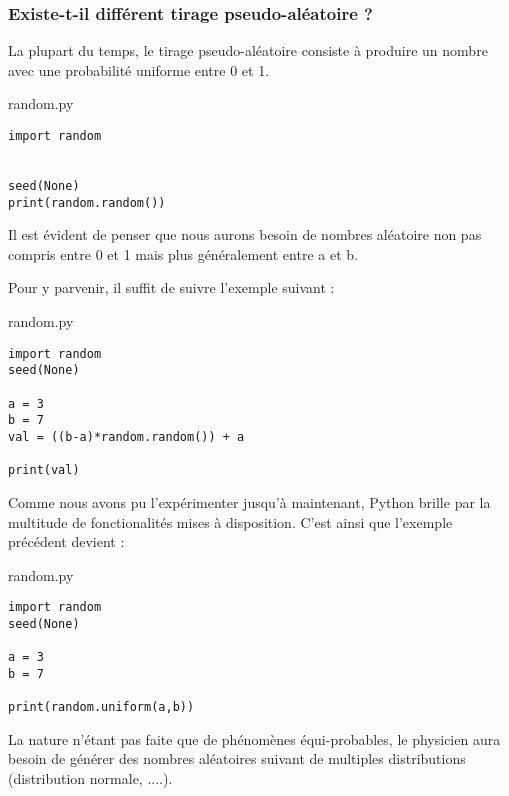 \subsubsection{Existe-t-il différent tirage pseudo-aléatoire ? }


La plupart du temps, le tirage pseudo-aléatoire consiste à produire un nombre
avec une probabilité uniforme entre 0 et 1.

\vskip 2pt
\begin{center}
  \begin{myterminalbox}[colback=gray!10]{random.py}
\begin{verbatim}
import random


seed(None)
print(random.random())
\end{verbatim}
  \end{myterminalbox}
\end{center}


Il est évident de penser que nous aurons besoin de nombres aléatoire non pas
compris entre 0 et 1 mais plus généralement entre a et b.

Pour y parvenir, il suffit de suivre l'exemple suivant : 
\vskip 2pt
\begin{center}
  \begin{myterminalbox}[colback=gray!10]{random.py}
\begin{verbatim}
import random
seed(None)

a = 3
b = 7 
val = ((b-a)*random.random()) + a

print(val)
\end{verbatim}
  \end{myterminalbox}
\end{center}


Comme nous avons pu l'expérimenter jusqu'à maintenant, Python brille par la multitude de fonctionalités mises à disposition.
C'est ainsi que l'exemple précédent devient :

\vskip 2pt
\begin{center}
  \begin{myterminalbox}[colback=gray!10]{random.py}
\begin{verbatim}
import random
seed(None)

a = 3
b = 7 

print(random.uniform(a,b))
\end{verbatim}
  \end{myterminalbox}
\end{center}

La nature n'étant pas faite que de phénomènes équi-probables, le physicien aura besoin de générer des nombres aléatoires suivant de multiples distributions  (distribution normale, ....).


